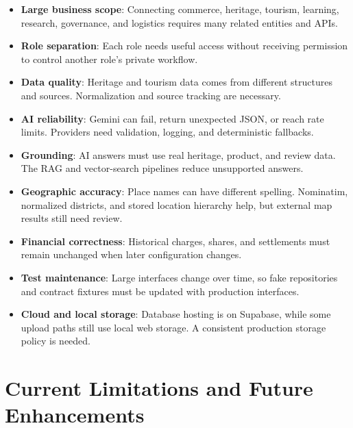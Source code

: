 \documentclass[12pt,a4paper]{report}
\begin{document}
\begin{itemize}
  \item \textbf{Large business scope}: Connecting commerce, heritage, tourism, learning, research, governance, and logistics requires many related entities and APIs.
  \item \textbf{Role separation}: Each role needs useful access without receiving permission to control another role's private workflow.
  \item \textbf{Data quality}: Heritage and tourism data comes from different structures and sources. Normalization and source tracking are necessary.
  \item \textbf{AI reliability}: Gemini can fail, return unexpected JSON, or reach rate limits. Providers need validation, logging, and deterministic fallbacks.
  \item \textbf{Grounding}: AI answers must use real heritage, product, and review data. The RAG and vector-search pipelines reduce unsupported answers.
  \item \textbf{Geographic accuracy}: Place names can have different spelling. Nominatim, normalized districts, and stored location hierarchy help, but external map results still need review.
  \item \textbf{Financial correctness}: Historical charges, shares, and settlements must remain unchanged when later configuration changes.
  \item \textbf{Test maintenance}: Large interfaces change over time, so fake repositories and contract fixtures must be updated with production interfaces.
  \item \textbf{Cloud and local storage}: Database hosting is on Supabase, while some upload paths still use local web storage. A consistent production storage policy is needed.
\end{itemize}

\chapter{Current Limitations and Future Enhancements}
\end{document}
